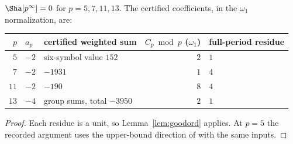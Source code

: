 \begin{theorem}\label{thm:small}
$\Sha[p^\infty]=0$ for $p=5,7,11,13$. The certified coefficients, in the $\omega_1$ normalization, are:
\begin{center}
\begin{tabular}{@{}rllrl@{}}
\toprule
$p$ & $a_p$ & certified weighted sum & $C_p\bmod p$ ($\omega_1$) & full-period residue\\ \midrule
$5$ & $-2$ & six-symbol value $152$ & $2$ & $1$\\
$7$ & $-2$ & $-1931$ & $1$ & $4$\\
$11$ & $-2$ & $-190$ & $8$ & $4$\\
$13$ & $-4$ & group sums, total $-3950$ & $2$ & $1$\\ \bottomrule
\end{tabular}
\end{center}
\end{theorem}
\begin{proof}
Each residue is a unit, so Lemma~\ref{lem:goodord} applies. At $p=5$ the recorded argument uses the upper-bound direction of \cite[Thm.~6.1]{sw} with the same inputs.
\end{proof}

